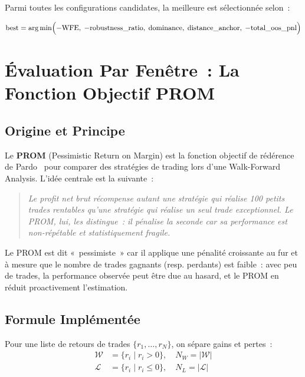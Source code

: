 Parmi toutes les configurations candidates, la meilleure est sélectionnée selon~:

\begin{equation}
\text{best} = \arg\min \Bigl(-\text{WFE},\; -\text{robustness\_ratio},\;
\text{dominance},\; \text{distance\_anchor},\; -\text{total\_oos\_pnl}\Bigr)
\label{eq:config_ranking}
\end{equation}

\section{Évaluation Par Fenêtre~: La Fonction Objectif PROM}
\label{sec:prom}

\subsection{Origine et Principe}

Le \textbf{PROM} (Pessimistic Return on Margin) est la fonction objectif de
rédérence de Pardo~\cite{pardo2008} pour comparer des stratégies de trading lors
d'une Walk-Forward Analysis. L'idée centrale est la suivante~:

\begin{quote}
\textit{Le profit net brut récompense autant une stratégie qui réalise
100 petits trades rentables qu'une stratégie qui réalise un seul trade
exceptionnel. Le PROM, lui, les distingue~: il pénalise la seconde car
sa performance est non-répétable et statistiquement fragile.}
\end{quote}

Le PROM est dit «~pessimiste~» car il applique une pénalité croissante au
fur et à mesure que le nombre de trades gagnants (resp. perdants) est faible~:
avec peu de trades, la performance observée peut être due au hasard, et le
PROM en réduit proactivement l'estimation.

\subsection{Formule Implémentée}

Pour une liste de retours de trades $\{r_1, \ldots, r_N\}$, on sépare
gains et pertes~:
\begin{align}
\mathcal{W} &= \{r_i \mid r_i > 0\}, \quad N_W = |\mathcal{W}| \label{eq:prom_wins}\\
\mathcal{L} &= \{r_i \mid r_i \leq 0\}, \quad N_L = |\mathcal{L}| \label{eq:prom_losses}
\end{align}


